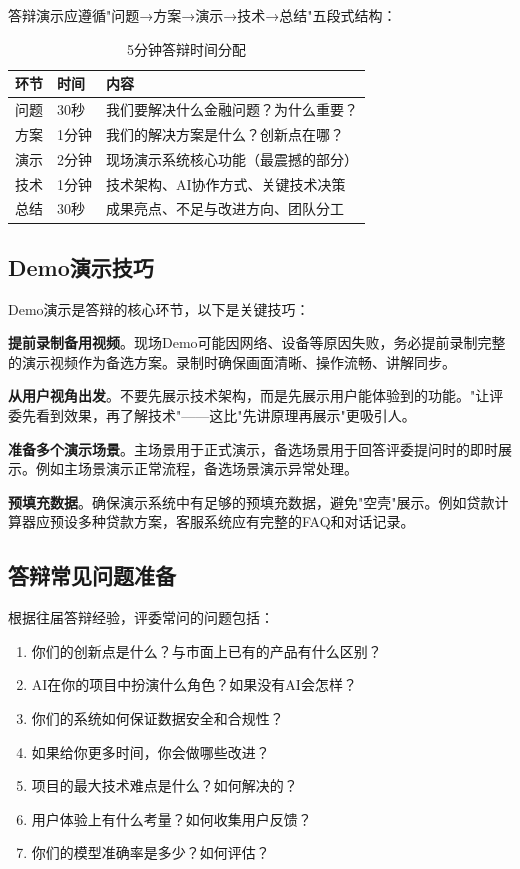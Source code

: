 答辩演示应遵循"问题→方案→演示→技术→总结"五段式结构：

\begin{table}[H]
\centering
\begin{tabular}{clp{6cm}}
\toprule
\textbf{环节} & \textbf{时间} & \textbf{内容} \\
\midrule
问题 & 30秒 & 我们要解决什么金融问题？为什么重要？ \\
方案 & 1分钟 & 我们的解决方案是什么？创新点在哪？ \\
演示 & 2分钟 & 现场演示系统核心功能（最震撼的部分） \\
技术 & 1分钟 & 技术架构、AI协作方式、关键技术决策 \\
总结 & 30秒 & 成果亮点、不足与改进方向、团队分工 \\
\bottomrule
\end{tabular}
\caption{5分钟答辩时间分配}
\end{table}

\subsection{Demo演示技巧}

Demo演示是答辩的核心环节，以下是关键技巧：

\textbf{提前录制备用视频}。现场Demo可能因网络、设备等原因失败，务必提前录制完整的演示视频作为备选方案。录制时确保画面清晰、操作流畅、讲解同步。

\textbf{从用户视角出发}。不要先展示技术架构，而是先展示用户能体验到的功能。"让评委先看到效果，再了解技术"——这比"先讲原理再展示"更吸引人。

\textbf{准备多个演示场景}。主场景用于正式演示，备选场景用于回答评委提问时的即时展示。例如主场景演示正常流程，备选场景演示异常处理。

\textbf{预填充数据}。确保演示系统中有足够的预填充数据，避免"空壳"展示。例如贷款计算器应预设多种贷款方案，客服系统应有完整的FAQ和对话记录。

\subsection{答辩常见问题准备}

根据往届答辩经验，评委常问的问题包括：

\begin{enumerate}[leftmargin=2em]
  \item 你们的创新点是什么？与市面上已有的产品有什么区别？
  \item AI在你的项目中扮演什么角色？如果没有AI会怎样？
  \item 你们的系统如何保证数据安全和合规性？
  \item 如果给你更多时间，你会做哪些改进？
  \item 项目的最大技术难点是什么？如何解决的？
  \item 用户体验上有什么考量？如何收集用户反馈？
  \item 你们的模型准确率是多少？如何评估？
\end{enumerate}

